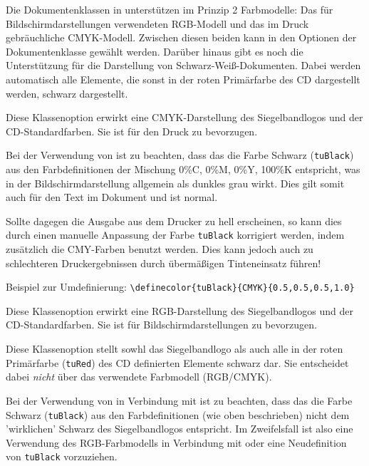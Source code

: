 Die Dokumentenklassen in \tubslatex unterstützen im Prinzip 2 Farbmodelle:
Das für Bildschirmdarstellungen verwendeten RGB-Modell und das im
Druck gebräuchliche CMYK-Modell. Zwischen diesen beiden kann in den Optionen
der Dokumentenklasse gewählt werden. Darüber hinaus gibt es noch die Unterstützung
für die Darstellung von Schwarz-Weiß-Dokumenten. Dabei werden automatisch
alle Elemente, die sonst in der roten Primärfarbe des CD dargestellt werden,
schwarz dargestellt.

\begin{Declaration}
\end{Declaration}

Diese Klassenoption erwirkt eine CMYK-Darstellung des Siegelbandlogos und der
CD-Standardfarben. Sie ist für den Druck zu bevorzugen.

\begin{important}
  Bei der Verwendung von  ist zu beachten,
  dass das die Farbe Schwarz (\texttt{tuBlack})
  aus den Farbdefinitionen der Mischung 0\%C, 0\%M, 0\%Y, 100\%K entspricht,
  was in der Bildschirmdarstellung allgemein als dunkles grau wirkt. Dies
  gilt somit auch für den Text im Dokument und ist normal.

  Sollte dagegen die Ausgabe aus dem Drucker zu hell erscheinen, so kann dies
  durch einen manuelle Anpassung der Farbe \texttt{tuBlack} korrigiert werden,
  indem zusätzlich die CMY-Farben benutzt werden. Dies kann jedoch auch zu
  schlechteren Druckergebnissen durch übermäßigen Tinteneinsatz führen!
  
  Beispiel zur Umdefinierung:
  \lstinline!\definecolor{tuBlack}{CMYK}{0.5,0.5,0.5,1.0}!
\end{important}

\begin{Declaration}
\end{Declaration}

Diese Klassenoption erwirkt eine RGB-Darstellung des Siegelbandlogos und der
CD-Standardfarben. Sie ist für Bildschirmdarstellungen zu bevorzugen.

\begin{Declaration}
\end{Declaration}

Diese Klassenoption stellt sowhl das Siegelbandlogo als auch alle in der
roten Primärfarbe (\texttt{tuRed}) des CD definierten Elemente schwarz dar.
Sie entscheidet dabei \emph{nicht} über das verwendete Farbmodell (RGB/CMYK).
\begin{important}
  Bei der Verwendung von  in Verbindung mit 
  ist zu beachten, dass das die Farbe Schwarz (\texttt{tuBlack})
  aus den Farbdefinitionen (wie oben beschrieben) nicht dem 'wirklichen' Schwarz
  des Siegelbandlogos entspricht.
  Im Zweifelsfall ist also eine Verwendung des RGB-Farbmodells in Verbindung
  mit  oder eine Neudefinition von \texttt{tuBlack} vorzuziehen.
\end{important}

